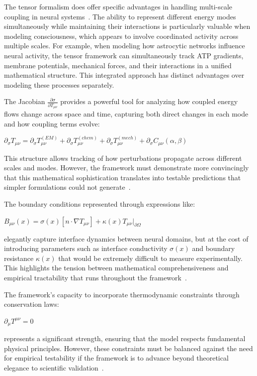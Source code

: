 The tensor formalism does offer specific advantages in handling multi-scale coupling in neural systems~\cite{deacon2013incomplete, rovelli2018order}. The ability to represent different energy modes simultaneously while maintaining their interactions is particularly valuable when modeling consciousness, which appears to involve coordinated activity across multiple scales. For example, when modeling how astrocytic networks influence neural activity, the tensor framework can simultaneously track ATP gradients, membrane potentials, mechanical forces, and their interactions in a unified mathematical structure. This integrated approach has distinct advantages over modeling these processes separately.

The Jacobian $\frac{\partial \sigma}{\partial T_{\mu\nu}}$ provides a powerful tool for analyzing how coupled energy flows change across space and time, capturing both direct changes in each mode and how coupling terms evolve:

$\partial_\sigma T_{\mu\nu} = \partial_\sigma T^{(EM)}_{\mu\nu} + \partial_\sigma T^{(chem)}_{\mu\nu} + \partial_\sigma T^{(mech)}_{\mu\nu} + \partial_\sigma C_{\mu\nu}(\alpha,\beta)$

This structure allows tracking of how perturbations propagate across different scales and modes. However, the framework must demonstrate more convincingly that this mathematical sophistication translates into testable predictions that simpler formulations could not generate~\cite{dennett2017bacteria, thompson2014waking}.

The boundary conditions represented through expressions like:

$B_{\mu\nu}(x) = \sigma(x)[n \cdot \nabla T_{\mu\nu}] + \kappa(x)T_{\mu\nu}|_{\partial\Omega}$

elegantly capture interface dynamics between neural domains, but at the cost of introducing parameters such as interface conductivity $\sigma(x)$ and boundary resistance $\kappa(x)$ that would be extremely difficult to measure experimentally. This highlights the tension between mathematical comprehensiveness and empirical tractability that runs throughout the framework~\cite{koch2019feeling, noe2009out}.

The framework's capacity to incorporate thermodynamic constraints through conservation laws:

$\partial_\mu T^{\mu\nu} = 0$

represents a significant strength, ensuring that the model respects fundamental physical principles. However, these constraints must be balanced against the need for empirical testability if the framework is to advance beyond theoretical elegance to scientific validation~\cite{varela2016embodied, goff2019galileo}.

